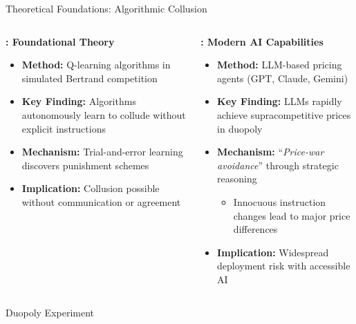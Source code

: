 \documentclass[10pt, aspectratio=169]{beamer}
\begin{document}
\begin{frame}{Theoretical Foundations: Algorithmic Collusion}
    \begin{columns}[c]
    \begin{block}{\textbf{\textcite{calvano_artificial_2020}: Foundational Theory}}
    \begin{itemize}
        \item \textbf{Method:} Q-learning algorithms in simulated Bertrand competition
        \item \textbf{Key Finding:} Algorithms autonomously learn to collude without explicit instructions
        \item \textbf{Mechanism:} Trial-and-error learning discovers punishment schemes
        \item \textbf{Implication:} Collusion possible without communication or agreement
    \end{itemize}
    \end{block}
    
    \begin{block}{\textbf{\textcite{fish_algorithmic_2025}: Modern AI Capabilities}}
    \begin{itemize}
        \item \textbf{Method:} LLM-based pricing agents (GPT, Claude, Gemini)
        \item \textbf{Key Finding:} LLMs rapidly achieve supracompetitive prices in duopoly
        \item \textbf{Mechanism:} \enquote{\emph{Price-war avoidance}} through strategic reasoning
        \begin{itemize}
            \item Innocuous instruction changes lead to major price differences
        \end{itemize}
        \item \textbf{Implication:} Widespread deployment risk with accessible AI
    \end{itemize}
    \end{block}
    \end{columns}
\end{frame}

\begin{frame}{Duopoly Experiment}
\centering
\begin{minipage}[b]{0.48\linewidth}
    \centering
    
\end{minipage}
\hfill
\begin{minipage}[b]{0.48\linewidth}
    \centering
    
\end{minipage}
\hfill\hyperlink{app:calvano}{}
\end{frame}
\end{document}
